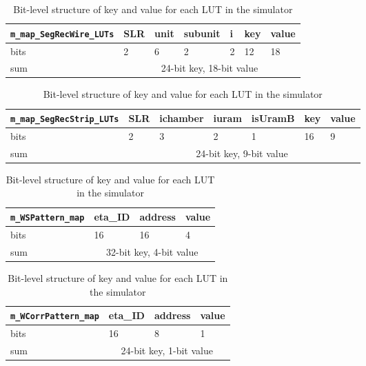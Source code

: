 \begin{table}[htbp]
  \centering
  \caption{Bit-level structure of key and value for each LUT in the simulator}
  \label{tab:LUT_store_structure}
  
  \begin{tabular}{|p{4.5cm}|p{1cm}|p{1cm}|p{2cm}|p{1cm}|p{1cm}|p{1cm}|}
    \hline
    \texttt{m\_map\_SegRecWire\_LUTs} & SLR & unit & subunit & i & key & value \\
    \hline
    bits & 2 & 6 & 2 & 2 & 12 & 18 \\
    \hline
    sum & \multicolumn{6}{c|}{24-bit key, 18-bit value} \\
    \hline
  \end{tabular}
  \vspace{0.5em}

  \begin{tabular}{|p{4.5cm}|p{1cm}|p{1.6cm}|p{1cm}|p{1.5cm}|p{0.9cm}|p{1cm}|}
    \hline
    \texttt{m\_map\_SegRecStrip\_LUTs} & SLR & ichamber & iuram & isUramB & key & value \\
    \hline
    bits & 2 & 3 & 2 & 1 & 16 & 9 \\
    \hline
    sum & \multicolumn{6}{c|}{24-bit key, 9-bit value} \\
    \hline
  \end{tabular}
  \vspace{0.5em}

  \begin{tabular}{|p{4.5cm}|p{3cm}|p{3cm}|p{1cm}|}
    \hline
    \texttt{m\_WSPattern\_map} & eta\_ID & address & value \\
    \hline
    bits & 16 & 16 & 4 \\
    \hline
    sum & \multicolumn{3}{c|}{32-bit key, 4-bit value} \\
    \hline
  \end{tabular}
  \vspace{0.5em}

  \begin{tabular}{|p{4.5cm}|p{3cm}|p{3cm}|p{1cm}|}
    \hline
    \texttt{m\_WCorrPattern\_map} & eta\_ID & address & value \\
    \hline
    bits & 16 & 8 & 1 \\
    \hline
    sum & \multicolumn{3}{c|}{24-bit key, 1-bit value} \\
    \hline
  \end{tabular}
  \vspace{0.5em}
\end{table}

